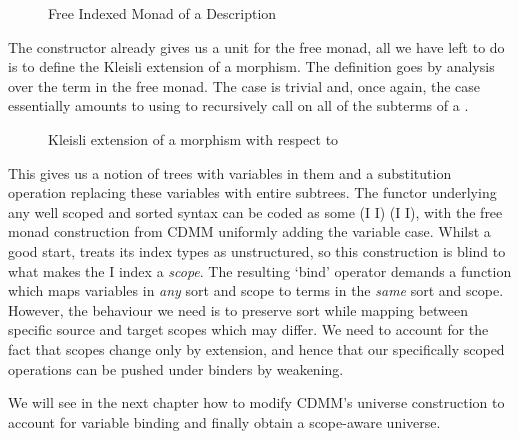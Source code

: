 \begin{figure}[h]
  \caption{Free Indexed Monad of a Description\label{fig:datafreemonad}}
\end{figure}

The  constructor already gives us a unit for the free monad,
all we have left to do is to define the Kleisli extension of a morphism.
The definition goes by analysis over the term in the free monad. The
 case is trivial and, once again, the  case
essentially amounts to using  to recursively call 
on all of the subterms of a .

\begin{figure}[h]
  \caption{Kleisli extension of a morphism with respect to ~\label{fig:datakleisli}}
\end{figure}

This gives us a notion of trees with variables in them and a substitution
operation replacing these variables with entire subtrees.
%
The functor underlying any well scoped and sorted syntax can be coded as
some { (I \AR{$\times$}  I) (I \AR{$\times$}  I)},
with the free monad construction from CDMM uniformly adding the variable
case. Whilst a good start,  treats its index types as unstructured,
so this construction is blind to what makes the { I} index a
\emph{scope}. The resulting `bind' operator demands a function which maps
variables in \emph{any} sort and scope to terms in the \emph{same} sort
and scope. However, the behaviour we need is to preserve sort while mapping
between specific source and target scopes which may differ. We need to
account for the fact that scopes change only by extension, and hence that our
specifically scoped operations can be pushed under binders by weakening.

We will see in the next chapter how to modify CDMM's universe construction
to account for variable binding and finally obtain a scope-aware universe.
